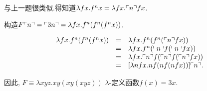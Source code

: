 
\begin{solution}
与上一题很类似.得知道$\lambda fx.f^n x = \lambda fx. \ulcorner{n}\urcorner fx$.

构造$F \ulcorner{n}\urcorner = \ulcorner{3n}\urcorner = \lambda fx. f^n (f^n (f^n x))$.

\[
 \begin{array}{rcl}
  \lambda fx. f^n (f^n (f^n x)) & = & \lambda fx. f^n (f^n (\ulcorner{n}\urcorner f x)) \\
  & = & \lambda fx. f^n (\ulcorner{n}\urcorner f (\ulcorner{n}\urcorner f x)) \\
  & = & \lambda fx. \ulcorner{n}\urcorner f (\ulcorner{n}\urcorner f (\ulcorner{n}\urcorner f x)) \\
  & = & [\lambda nfx. nf (nf (nfx))] \ulcorner{n}\urcorner.
 \end{array}
\]

因此, $F \equiv \lambda xyz. xy(xy(xyz))$ $\lambda$-定义函数$f(x)=3x$.
\end{solution}